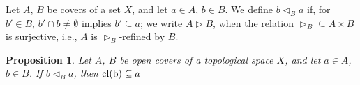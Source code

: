 \documentclass[12pt]{amsart}
\theoremstyle{plain}
\newtheorem{corollary}[theorem]{\bf Corollary}
\newtheorem{remark}[theorem]{\bf Remark}
\newtheorem{proposition}[theorem]{\bf Proposition}
\newcommand {\cl}[1]{{\rm{cl}(#1)}}
\newcommand \PPb{\mathbb{P}}
\begin{document}
	
	
	
	
	
	
	
Let $A$, $B$ be covers of a set $X$, and let $a \in A$, $b \in B$. We define $b \lhd_B a$ if, for $b' \in B$, $b' \cap b \neq \emptyset$ implies $b' \subseteq a$; we write $A \rhd B$, when  the relation $\rhd_B \subseteq A \times B$ is surjective, i.e., $A$ is $\rhd_B$-refined by $B$.
%
\begin{proposition}
\label{pr:StarRefClosure}
Let $A$, $B$ be open covers of a topological space $X$, and let $a \in A$, $b \in B$. If $b \lhd_B a$, then $\cl{b} \subseteq a$
\end{proposition}
	
\end{document}
